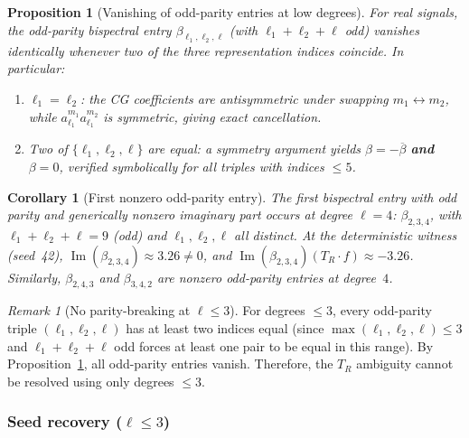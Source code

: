 \documentclass{article}
\newtheorem{proposition}[theorem]{Proposition}
\newtheorem{corollary}[theorem]{Corollary}
\theoremstyle{definition}
\theoremstyle{remark}
\newtheorem{remark}[theorem]{Remark}
\DeclareMathOperator{\im}{Im}
\newcommand{\conj}[1]{\overline{#1}}
\theoremstyle{definition}
\begin{document}
\begin{proposition}[Vanishing of odd-parity entries at low degrees]
\label{prop:app-odd-vanishing}
For real signals, the odd-parity bispectral entry
$\beta_{\ell_1,\ell_2,\ell}$ (with $\ell_1+\ell_2+\ell$ odd)
vanishes identically whenever two of the three representation indices
coincide. In particular:
\begin{enumerate}[nosep,label=(\roman*)]
\item $\ell_1 = \ell_2$: the CG coefficients are antisymmetric
  under swapping $m_1 \leftrightarrow m_2$, while
  $a_{\ell_1}^{m_1} a_{\ell_1}^{m_2}$ is symmetric, giving
  exact cancellation.
\item Two of $\{\ell_1, \ell_2, \ell\}$ are equal: a symmetry
  argument yields $\beta = -\conj\beta$ \textbf{and}
  $\beta = 0$, verified symbolically for all
  triples with indices $\le 5$.
\end{enumerate}
\end{proposition}

\begin{corollary}[First nonzero odd-parity entry]\label{cor:app-first-odd}
The first bispectral entry with odd parity and generically nonzero imaginary
part occurs at degree $\ell = 4$:
$\beta_{2,3,4}$, with
$\ell_1+\ell_2+\ell = 9$ (odd) and
$\ell_1, \ell_2, \ell$ all distinct.
At the deterministic witness (seed~42), $\im(\beta_{2,3,4}) \approx 3.26 \ne 0$,
and $\im(\beta_{2,3,4})(T_R \cdot f) \approx -3.26$.
Similarly, $\beta_{2,4,3}$ and $\beta_{3,4,2}$ are nonzero odd-parity entries
at degree~$4$.
\end{corollary}

\begin{remark}[No parity-breaking at $\ell \le 3$]
For degrees $\le 3$, every odd-parity triple $(\ell_1,\ell_2,\ell)$
has at least two indices equal (since $\max(\ell_1,\ell_2,\ell) \le 3$
and $\ell_1+\ell_2+\ell$ odd forces at least one pair to be equal in this range).
By Proposition~\ref{prop:app-odd-vanishing}, all odd-parity entries vanish.
Therefore, the $T_R$ ambiguity cannot be resolved using only degrees $\le 3$.
\end{remark}

\subsubsection{Seed recovery ($\ell \le 3$)}
\end{document}

